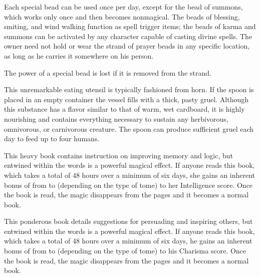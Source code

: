 {Each special bead can be used once per day, except for the bead of summons, which works only once and then becomes nonmagical. The beads of blessing, smiting, and wind walking function as spell trigger items; the beads of karma and summons can be activated by any character capable of casting divine spells. The owner need not hold or wear the strand of prayer beads in any specific location, as long as he carries it somewhere on his person.

The power of a special bead is lost if it is removed from the strand.


 This unremarkable eating utensil is typically fashioned from horn. If the spoon is placed in an empty container the vessel fills with a thick, pasty gruel. Although this substance has a flavor similar to that of warm, wet cardboard, it is highly nourishing and contains everything necessary to sustain any herbivorous, omnivorous, or carnivorous creature. The spoon can produce sufficient gruel each day to feed up to four humans.


 This heavy book contains instruction on improving memory and logic, but entwined within the words is a powerful magical effect. If anyone reads this book, which takes a total of 48 hours over a minimum of six days, she gains an inherent bonus of from  to  (depending on the type of tome) to her Intelligence score. Once the book is read, the magic disappears from the pages and it becomes a normal book. 


 This ponderous book details suggestions for persuading and inspiring others, but entwined within the words is a powerful magical effect. If anyone reads this book, which takes a total of 48 hours over a minimum of six days, he gains an inherent bonus of from  to  (depending on the type of tome) to his Charisma score. Once the book is read, the magic disappears from the pages and it becomes a normal book. 

}
